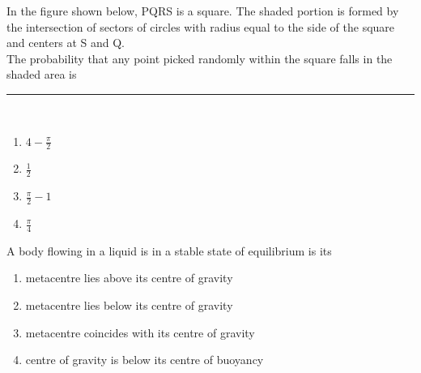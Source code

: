 \item In the figure shown below, PQRS is a square. The shaded portion is formed by the intersection of sectors of circles with radius equal to the side of the square and centers at S and Q.\\
The probability that any point picked randomly within the square falls in the shaded area is \rule{1cm}{0.15mm}\\
\centering
{}
\begin{multicols}{2}
    \begin{enumerate}
        \item $4- \frac{\pi}{2}$
        \item $\frac{1}{2}$
        \item $\frac{\pi}{2} - 1$
        \item $\frac{\pi}{4}$
    \end{enumerate}
\end{multicols}

\item A body flowing in a liquid is in a stable state of equilibrium is its
\begin{multicols}{2}
    \begin{enumerate}
        \item metacentre lies above its centre of gravity
        \item metacentre lies below its centre of gravity
        \item metacentre coincides with its centre of gravity
        \item centre of gravity is below its centre of buoyancy
    \end{enumerate}
\end{multicols}

